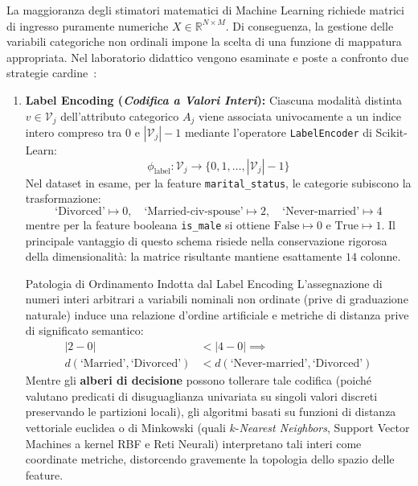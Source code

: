 La maggioranza degli stimatori matematici di Machine Learning richiede matrici di ingresso puramente numeriche $X \in \mathbb{R}^{N \times M}$. Di conseguenza, la gestione delle variabili categoriche non ordinali impone la scelta di una funzione di mappatura appropriata. Nel laboratorio didattico vengono esaminate e poste a confronto due strategie cardine~\cite{mannocci2026imbalanced}:

\begin{enumerate}
    \item \textbf{Label Encoding (\textit{Codifica a Valori Interi}):}
    Ciascuna modalità distinta $v \in \mathcal{V}_j$ dell'attributo categorico $A_j$ viene associata univocamente a un indice intero compreso tra $0$ e $|\mathcal{V}_j| - 1$ mediante l'operatore \texttt{LabelEncoder} di Scikit-Learn:
    \begin{equation}
        \phi_{\text{label}}: \mathcal{V}_j \to \{0, 1, \dots, |\mathcal{V}_j| - 1\}
    \end{equation}
    Nel dataset in esame, per la feature \texttt{marital\_status}, le categorie subiscono la trasformazione:
    \begin{equation*}
        \text{`Divorced'} \mapsto 0, \quad \text{`Married-civ-spouse'} \mapsto 2, \quad \text{`Never-married'} \mapsto 4
    \end{equation*}
    mentre per la feature booleana \texttt{is\_male} si ottiene $\text{False} \mapsto 0$ e $\text{True} \mapsto 1$. Il principale vantaggio di questo schema risiede nella conservazione rigorosa della dimensionalità: la matrice risultante mantiene esattamente $14$ colonne.
    
    \begin{alertblock}{Patologia di Ordinamento Indotta dal Label Encoding}
    L'assegnazione di numeri interi arbitrari a variabili nominali non ordinate (prive di graduazione naturale) induce una relazione d'ordine artificiale e metriche di distanza prive di significato semantico:
    \begin{align*}
        |2 - 0| &< |4 - 0| \implies \\
        d(\text{`Married'}, \text{`Divorced'}) &< d(\text{`Never-married'}, \text{`Divorced'})
    \end{align*}
    Mentre gli \textbf{alberi di decisione} possono tollerare tale codifica (poiché valutano predicati di disuguaglianza univariata su singoli valori discreti preservando le partizioni locali), gli algoritmi basati su funzioni di distanza vettoriale euclidea o di Minkowski (quali $k$-\textit{Nearest Neighbors}, Support Vector Machines a kernel RBF e Reti Neurali) interpretano tali interi come coordinate metriche, distorcendo gravemente la topologia dello spazio delle feature.
    \end{alertblock}


\end{enumerate}
